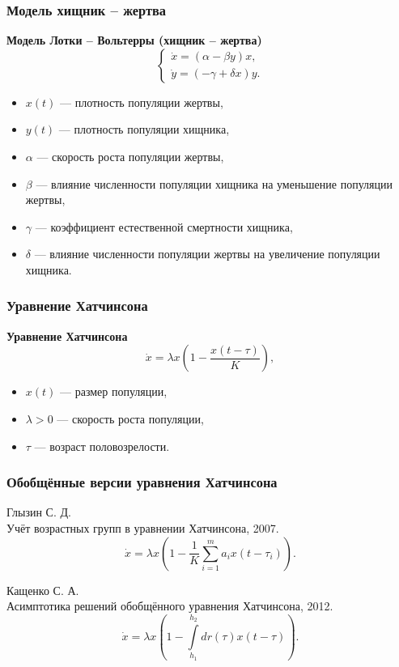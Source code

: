 \begin{frame}
	\frametitle{Модель хищник -- жертва}
	
	\textbf{Модель Лотки -- Вольтерры (хищник -- жертва)}
	\begin{equation*}
		\begin{cases}
			\dot{x}=(\alpha-\beta y)x,\\
			\dot{y}=(-\gamma+\delta x)y.
		\end{cases}
	\end{equation*}
	\begin{itemize}
	\item $x(t)$ --- плотность популяции жертвы,
	\item $y(t)$ --- плотность популяции хищника,
	\item $\alpha$ --- скорость роста популяции жертвы,
	\item $\beta$ --- влияние численности популяции хищника на уменьшение популяции жертвы,
	\item $\gamma$ --- коэффициент естественной смертности хищника, \item $\delta$ --- влияние численности популяции жертвы на увеличение популяции хищника.
	\end{itemize}
	
\end{frame}

\begin{frame}
	\frametitle{Уравнение Хатчинсона}
	
	\textbf{Уравнение Хатчинсона}
	\begin{equation*}
		\label{eq:intro:hutch}
		\dot{x}=\lambda x\left(1 - \frac{x(t-\tau)}{K}\right),
	\end{equation*}
	\begin{itemize}
		\item $x(t)$ --- размер популяции,
		\item $\lambda > 0$ --- скорость роста популяции,
		\item $\tau$ --- возраст половозрелости.
	\end{itemize}
	
\end{frame}


\begin{frame}
	\frametitle{Обобщённые версии уравнения Хатчинсона}
	
	Глызин С. Д.\\Учёт возрастных групп в уравнении Хатчинсона, 2007.
	\begin{equation*}
		\dot{x}=\lambda x\left(1 - \frac{1}{K}\sum\limits_{i = 1}^{m} a_i x(t-\tau_i)\right).
	\end{equation*}
	
	\pause
	
	Кащенко С. А.\\Асимптотика решений обобщённого уравнения Хатчинсона, 2012.
	\begin{equation*}
		\dot{x} = \lambda x \left(1 - \int\limits_{h_1}^{h_2}dr(\tau)x(t - \tau)\right).
	\end{equation*}
\end{frame}


